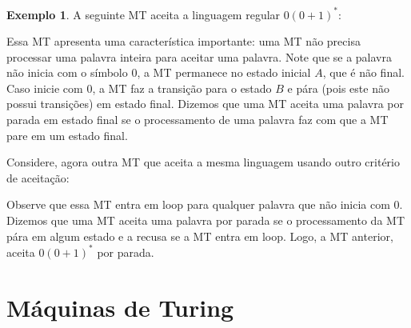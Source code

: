 \documentclass[a4paper]{article}
\theoremstyle{definition}
\newtheorem{Example}{Exemplo}
\begin{document}
 \begin{Example}
   A seguinte MT aceita a linguagem regular $0(0+1)^*$:
    \begin{figure}[H]
      \centering
    \end{figure}
    Essa MT apresenta uma característica importante: uma MT não precisa processar
    uma palavra inteira para aceitar uma palavra. Note que se a palavra não inicia
    com o símbolo $0$, a MT permanece no estado inicial $A$, que é não final.
    Caso inicie com $0$, a MT faz a transição para o estado $B$ e pára (pois
    este não possui transições) em estado final.
    Dizemos que uma MT aceita uma palavra por parada em estado final se o
    processamento de uma palavra faz com que a MT pare em um estado final.

    Considere, agora outra MT que aceita a mesma linguagem usando outro critério
    de aceitação:
    \begin{figure}[H]
      \centering
    \end{figure}

    Observe que essa MT entra em loop para qualquer palavra que não inicia com
    $0$. Dizemos que uma MT aceita uma palavra por parada se o processamento da
    MT pára em algum estado e a recusa se a MT entra em loop. Logo, a MT
    anterior, aceita $0(0+1)^*$ por parada.
 \end{Example}

 \section{Máquinas de Turing}
\end{document}
